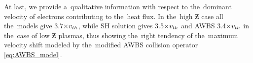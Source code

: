At last, we provide a~qualitative information with respect to the~dominant 
velocity of electrons contributing to the~heat flux. In the~high $\Zbar$ case
all the~models give 3.7$\times v_{th}$, while SH solution gives 3.5$\times v_{th}$
and AWBS 3.4$\times v_{th}$ in the~case of low $\Zbar$ plasmas, thus showing 
the~right tendency of the~maximum velocity shift modeled by the~modified AWBS
collision operator \eqref{eq:AWBS_model}.

